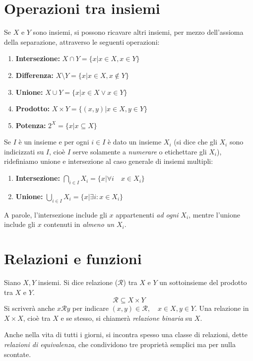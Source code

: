 \documentclass[oneside]{book}
\theoremstyle{remark}
\begin{document}
\section{Operazioni tra insiemi}
Se $X$ e $Y$ sono insiemi, si possono ricavare altri insiemi, per mezzo
dell'assioma della separazione, attraverso le seguenti operazioni:
\begin{enumerate}
\item \textbf{Intersezione:} $X\cap Y=\{x|x\in X, x\in Y\}$
\item \textbf{Differenza:} $X\setminus Y=\{x|x\in X,x\not\in Y\}$
\item \textbf{Unione:} $X\cup Y=\{x|x\in X \vee x\in Y\}$
\item \textbf{Prodotto:} $X\times Y=\{(x,y)|x\in X, y\in Y\}$
\item \textbf{Potenza:} $2^X=\{x|x\subseteq X\}$
\end{enumerate}
Se $I$ è un insieme e per ogni $i\in I$ è dato un insieme $X_i$
(si dice che gli $X_i$ sono indicizzati su $I$, cioè $I$ serve
solamente a \emph{numerare} o etichettare gli $X_i$), ridefiniamo
unione e intersezione al caso generale di insiemi multipli:
\begin{enumerate}
\item \textbf{Intersezione:} $\bigcap_{i\in I}X_i=\{x|\forall i \quad x\in X_i\}$
\item \textbf{Unione:} $\bigcup_{i\in I}X_i=\{x|\exists i:x\in X_i\}$
\end{enumerate}
A parole, l'intersezione include gli $x$ appartenenti \textit{ad ogni}
$X_i$, mentre l'unione include gli $x$ contenuti in \textit{almeno un}
$X_i$.



\section{Relazioni e funzioni}\label{relaz}
\begin{tcolorbox}[colback=yellow!30, colframe=yellow!30!black, title={Relazione}]
Siano $X,Y$ insiemi. Si dice relazione ($\mathcal{R}$) tra $X$ e $Y$ un sottoinsieme
del prodotto tra $X$ e $Y$.
\[\mathcal{R}\subseteq X\times Y\]
Si scriverà anche $x\mathcal{R}y$ per indicare $(x,y)\in\mathcal{R},
\quad x\in X,y\in Y$. Una relazione in $X\times X$, cioè tra $X$ e se stesso,
si chiamerà \textit{relazione binaria} su $X$.
\end{tcolorbox}

\noindent Anche nella vita di tutti i giorni, si incontra spesso una classe di relazioni,
dette \textit{relazioni di equivalenza}, che condividono tre proprietà semplici ma per
nulla scontate.
\end{document}
